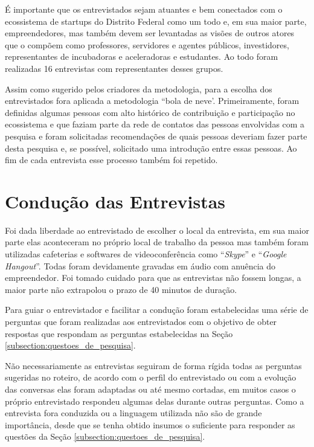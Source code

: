É importante que os entrevistados sejam atuantes e bem conectados com o ecossistema de startups do Distrito Federal como um todo e, em sua maior parte, empreendedores, mas também devem ser levantadas as visões de outros atores que o compõem como professores, servidores e agentes públicos, investidores, representantes de incubadoras e aceleradoras e estudantes. Ao todo foram realizadas 16 entrevistas com representantes desses grupos.

Assim como sugerido pelos criadores da metodologia, para a escolha dos entrevistados fora aplicada a metodologia ``bola de neve'. Primeiramente, foram definidas algumas pessoas com alto histórico de contribuição e participação no ecossistema e que faziam parte da rede de contatos das pessoas envolvidas com a pesquisa e foram solicitadas recomendações de quais pessoas deveriam fazer parte desta pesquisa e, se possível, solicitado uma introdução entre essas pessoas. Ao fim de cada entrevista esse processo também foi repetido.

\section{Condução das Entrevistas}
\label{subsection:conducao_das_entrevistas}

Foi dada liberdade ao entrevistado de escolher o local da entrevista, em sua maior parte elas aconteceram no próprio local de trabalho da pessoa mas também foram utilizadas cafeterias e softwares de videoconferência como ``\textit{Skype}'' e ``\textit{Google Hangout}''. Todas foram devidamente gravadas em áudio com anuência do empreendedor. Foi tomado cuidado para que as entrevistas não fossem longas, a maior parte não extrapolou o prazo de 40 minutos de duração. 

Para guiar o entrevistador e facilitar a condução foram estabelecidas uma série de perguntas que foram realizadas aos entrevistados com o objetivo de obter respostas que respondam as perguntas estabelecidas na Seção \ref{subsection:questoes_de_pesquisa}.

Não necessariamente as entrevistas seguiram de forma rígida todas as perguntas sugeridas no roteiro, de acordo com o perfil do entrevistado ou com a evolução das conversas elas foram adaptadas ou até mesmo cortadas, em muitos casos o próprio entrevistado respondeu algumas delas durante outras perguntas. Como a entrevista fora conduzida ou a linguagem utilizada não são de grande importância, desde que se tenha obtido insumos o suficiente para responder as questões da Seção \ref{subsection:questoes_de_pesquisa}.

